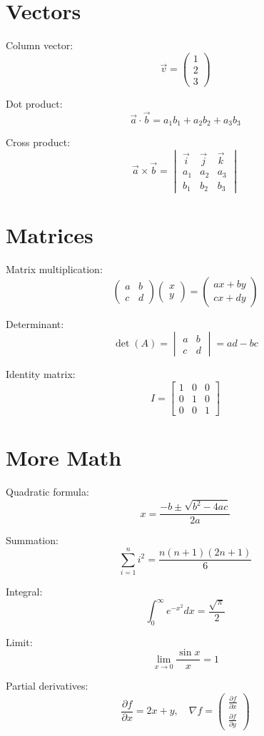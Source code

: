 \documentclass{article}
\begin{document}
\section*{Vectors}

Column vector:
\[ \vec{v} = \begin{pmatrix} 1 \\ 2 \\ 3 \end{pmatrix} \]

Dot product:
\[ \vec{a} \cdot \vec{b} = a_1 b_1 + a_2 b_2 + a_3 b_3 \]

Cross product:
\[ \vec{a} \times \vec{b} = \begin{vmatrix} \vec{i} & \vec{j} & \vec{k} \\ a_1 & a_2 & a_3 \\ b_1 & b_2 & b_3 \end{vmatrix} \]

\section*{Matrices}

Matrix multiplication:
\[ \begin{pmatrix} a & b \\ c & d \end{pmatrix} \begin{pmatrix} x \\ y \end{pmatrix} = \begin{pmatrix} ax + by \\ cx + dy \end{pmatrix} \]

Determinant:
\[ \det(A) = \begin{vmatrix} a & b \\ c & d \end{vmatrix} = ad - bc \]

Identity matrix:
\[ I = \begin{bmatrix} 1 & 0 & 0 \\ 0 & 1 & 0 \\ 0 & 0 & 1 \end{bmatrix} \]

\section*{More Math}

Quadratic formula:
\[ x = \frac{-b \pm \sqrt{b^2 - 4ac}}{2a} \]

Summation:
\[ \sum_{i=1}^{n} i^2 = \frac{n(n+1)(2n+1)}{6} \]

Integral:
\[ \int_0^\infty e^{-x^2} dx = \frac{\sqrt{\pi}}{2} \]

Limit:
\[ \lim_{x \to 0} \frac{\sin x}{x} = 1 \]

Partial derivatives:
\[ \frac{\partial f}{\partial x} = 2x + y, \quad \nabla f = \begin{pmatrix} \frac{\partial f}{\partial x} \\ \frac{\partial f}{\partial y} \end{pmatrix} \]
\end{document}
